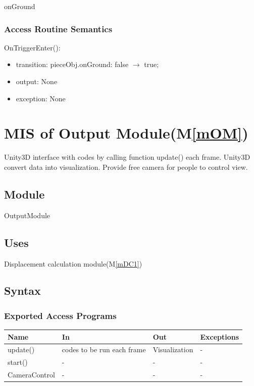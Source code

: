 \documentclass[12pt, titlepage]{article}
\newcommand{\mref}[1]{M\ref{#1}}
\begin{document}
onGround

\subsubsection{Access Routine Semantics}

\noindent OnTriggerEnter():
\begin{itemize}
	\item transition: pieceObj.onGround: false $\to$ true;
	\item output: None 
	\item exception: None 
\end{itemize}

\section{MIS of Output Module(\mref{mOM})}

Unity3D interface with codes by calling function update() each frame. Unity3D convert data into visualization. Provide free camera for people to control view.

\subsection{Module}

OutputModule

\subsection{Uses}

Displacement calculation module(\mref{mDC1})

\subsection{Syntax}

\subsubsection{Exported Access Programs}

\begin{center}
	\begin{tabular}{p{3cm} p{5cm} p{4cm} p{2cm}}
		\hline
		\textbf{Name} & \textbf{In} & \textbf{Out} & \textbf{Exceptions} \\
		\hline
		update() & codes to be run each frame & Visualization & - \\
		start() & - & - & - \\
		CameraControl & - & - & - \\
		\hline
	\end{tabular}
\end{center}
\end{document}
